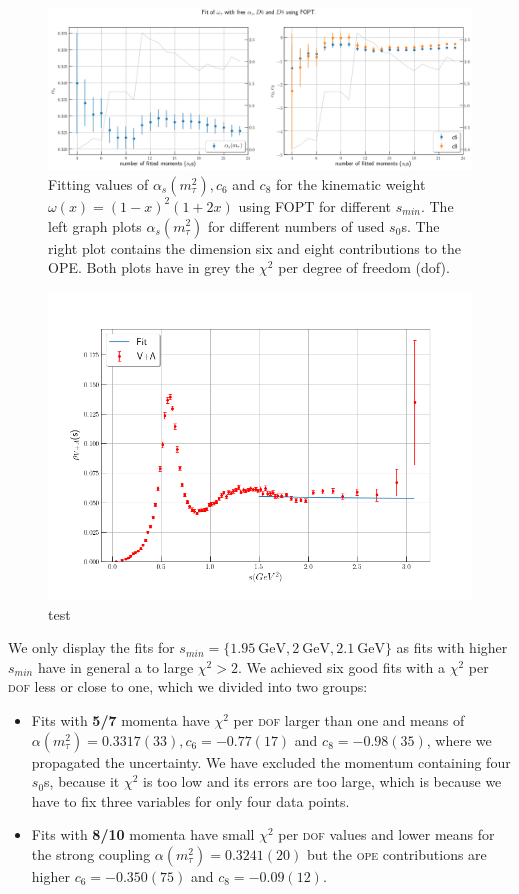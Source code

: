 \documentclass[../../index.tex]{subfiles}
\begin{document}
\begin{figure}
  \centering
  \includegraphics[width=\textwidth]{./images/fitWKinAlD6D8.png}
  \caption{Fitting values of $\alpha_s(m_\tau^2), c_6$ and $c_8$ for the kinematic weight
    $\omega(x)=(1-x)^2(1+2x)$ using FOPT for different $s_{min}$. The left graph plots $\alpha_s(m_\tau^2)$ for
    different numbers of used $s_0$s. The right plot contains the dimension six
    and eight contributions to the OPE. Both plots have in grey the $\chi^2$ per
  degree of freedom (dof).}
  \label{fig:fitWKinAlD6D8}
\end{figure}
\begin{figure}
  \centering
  \includegraphics[width=\textwidth]{./images/fitWKinAlD6D8SpecFunc.png}
  \caption{test}
\end{figure}
We only display the fits for $s_{min}=\{\SI{1.95}{\giga\eV}, \SI{2}{\giga\eV},
\SI{2.1}{\giga\eV}\}$ as fits with higher $s_{min}$ have in general a to large
$\chi^2>2$. We achieved six good fits with a $\chi^2$ per \textsc{dof} less or
close to one, which we divided into two groups:
\begin{itemize}
  \item Fits with \textbf{5\-/7} momenta have $\chi^2$ per \textsc{dof} larger
    than one and means of $\alpha(m_\tau^2)=0.3317(33),
    c_6=-0.77(17)$ and $c_8=-0.98(35)$, where we propagated the uncertainty. We
    have excluded the momentum containing four $s_0$s, because it $\chi^2$ is
    too low and its errors are too large, which is because we have to fix three
    variables for only four data points.
  \item Fits with \textbf{8\-/10} momenta have small $\chi^2$ per \textsc{dof}
    values and lower means for the strong
    coupling $\alpha(m_\tau^2)=0.3241(20)$ but the \textsc{ope} contributions
    are higher $c_6=-0.350(75)$ and $c_8=-0.09(12)$.
\end{itemize}
\end{document}
